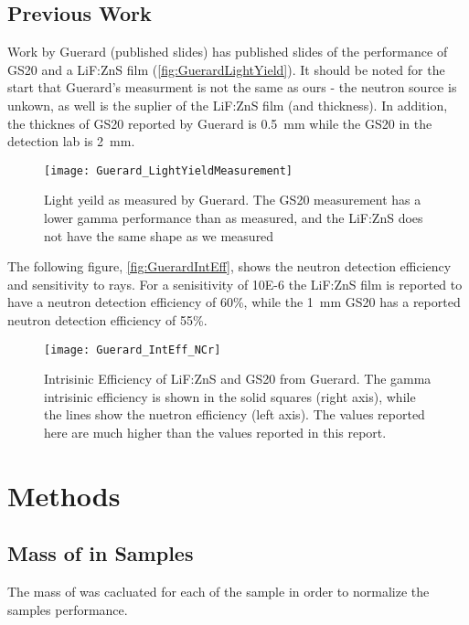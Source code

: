 \documentclass[draftcls,onecolumn]{IEEEtran}
\begin{document}
\subsection{Previous Work}

Work by Guerard (published slides) has published slides of the performance of GS20 and a LiF:ZnS film (\autoref{fig:GuerardLightYield}).
It should be noted for the start that Guerard's measurment is not the same as ours - the neutron source is unkown, as well is the suplier of the LiF:ZnS film (and thickness). 
In addition, the thicknes of GS20 reported by Guerard is \SI{0.5}{\mm} while the GS20 in the detection lab is \SI{2}{\mm}.
\begin{figure}
  \centering
  \texttt{[image: Guerard\_LightYieldMeasurement]}
  \caption[Measured Light Yield (Guerard)]{Light yeild as measured by Guerard. The GS20 measurement has a lower gamma performance than as measured, and the LiF:ZnS does not have the same shape as we measured}
	\label{fig:GuerardLightYield}
\end{figure}
The following figure, \autoref{fig:GuerardIntEff}, shows the neutron detection efficiency and sensitivity to  rays.
For a senisitivity of \num{10E-6} the LiF:ZnS film is reported to have a neutron detection efficiency of 60\%, while the \SI{1}{\mm} GS20 has a reported neutron detection efficiency of 55\%.
\begin{figure}
  \centering
  \texttt{[image: Guerard\_IntEff\_NCr]}
  \caption[Intrisinic Efficiency (Geurard)]{Intrisinic Efficiency of LiF:ZnS and GS20 from Guerard.  The gamma intrisinic efficiency is shown in the solid squares (right axis), while the lines show the nuetron efficiency (left axis). The values reported here are much higher than the values reported in this report.}
	\label{fig:GuerardIntEff}
\end{figure}

\section{Methods}

\subsection{Mass of  in Samples}
The mass of  was cacluated for each of the sample in order to normalize the samples performance.
\end{document}
